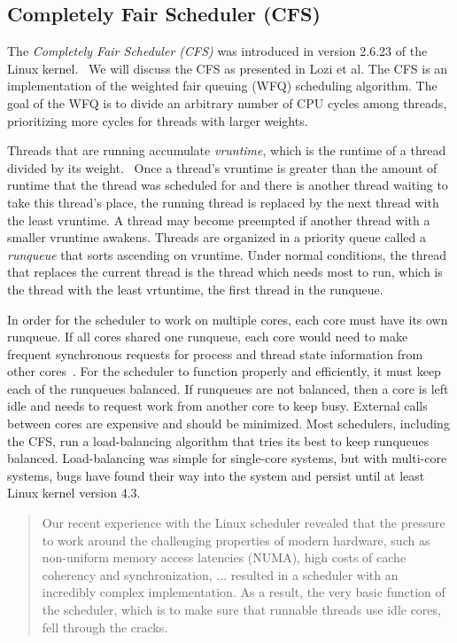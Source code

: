 \documentclass{sig-alternate}
\begin{document}
\subsection{Completely Fair Scheduler (CFS)}
\label{sec:cfs}

The \emph{Completely Fair Scheduler (CFS)} was introduced in version 2.6.23 of the Linux kernel.~\cite{Jo:2017} We will discuss the CFS as presented in Lozi et al. The CFS is an implementation of the weighted fair queuing (WFQ) scheduling algorithm. The goal of the WFQ is to divide an arbitrary number of CPU cycles among threads, prioritizing more cycles for threads with larger weights.~\cite{Lozi:2016}

Threads that are running accumulate \emph{vruntime}, which is the runtime of a thread divided by its weight.~\cite{SchedThesis} Once a thread's vruntime is greater than the amount of runtime that the thread was scheduled for and there is another thread waiting to take this thread's place, the running thread is replaced by the next thread with the least vruntime. A thread may become preempted if another thread with a smaller vruntime awakens. Threads are organized in a priority queue called a \emph{runqueue} that sorts ascending on vruntime. Under normal conditions, the thread that replaces the current thread is the thread which needs most to run, which is the thread with the least vrtuntime, the first thread in the runqueue.~\cite{Lozi:2016}

In order for the scheduler to work on multiple cores, each core must have its own runqueue. If all cores shared one runqueue, each core would need to make frequent synchronous requests for process and thread state information from other cores~\cite{Lozi:2016}. For the scheduler to function properly and efficiently, it must keep each of the runqueues balanced. If runqueues are not balanced, then a core is left idle and needs to request work from another core to keep busy. External calls between cores are expensive and should be minimized. Most schedulers, including the CFS, run a load-balancing algorithm that tries its best to keep runqueues balanced. Load-balancing was simple for single-core systems, but with multi-core systems, bugs have found their way into the system and persist until at least Linux kernel version 4.3.

\begin{quote}
Our recent experience with the Linux scheduler revealed that the pressure to work around the challenging properties of modern hardware, such as non-uniform memory access latencies (NUMA), high costs of cache coherency and synchronization, ... resulted in a scheduler with an incredibly complex implementation. As a result, the very basic function of the scheduler, which is to make sure that runnable threads use idle cores, fell through the cracks.~\cite{Lozi:2016}
\end{quote}
\end{document}
